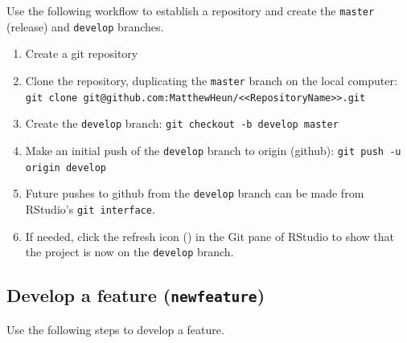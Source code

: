 \documentclass{article}
\begin{document}
Use the following workflow to establish a repository and 
create the \texttt{master} (release) and \texttt{develop} branches.
%
\begin{enumerate}

  \item Create a git repository

  \item Clone the repository, duplicating the \texttt{master} branch on the local computer:
  		\texttt{git clone git@github.com:MatthewHeun/<<RepositoryName>>.git}
  
  \item Create the \texttt{develop} branch: 
  		\texttt{git checkout -b develop master}
		
  \item Make an initial push of the \texttt{develop} branch to origin (github):
        \texttt{git push -u origin develop}
		
  \item Future pushes to github from the \texttt{develop} branch 
  		can be made from RStudio's \texttt{git interface}.

  \item If needed, click the refresh icon 
  		() in the Git pane of RStudio to 
  		show that the project is now on the \texttt{develop} branch.
  
\end{enumerate}


\subsection{Develop a feature (\texttt{newfeature})} 
\label{sec:feature}

Use the following steps to develop a feature.
\end{document}
